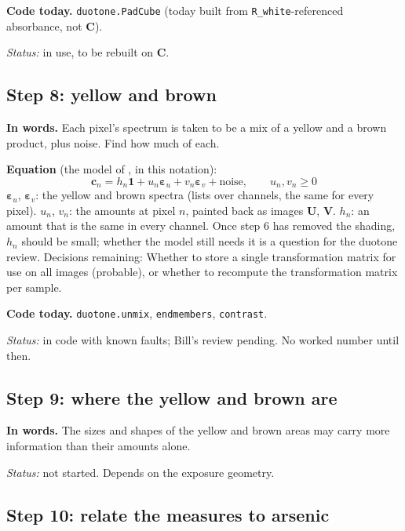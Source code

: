\documentclass[11pt,letter]{article}
\newcommand{\file}[1]{\texttt{\seqsplit{#1}}}
\newcommand{\code}[1]{\texttt{#1}}
\newcommand{\status}[1]{\par\noindent\textit{Status:} #1\par}
\newcommand{\mC}{\mathbf{C}}   %
\newcommand{\mU}{\mathbf{U}}   %
\newcommand{\mV}{\mathbf{V}}   %
\newcommand{\vc}{\mathbf{c}}           %
\newcommand{\vone}{\mathbf{1}}
\newcommand{\epsu}{\bm{\varepsilon}_u} %
\newcommand{\epsv}{\bm{\varepsilon}_v} %
\begin{document}
\textbf{Code today.}  \code{duotone.PadCube} (today built from
\code{R\_white}-referenced absorbance, not $\mC$).

\status{in use, to be rebuilt on $\mC$.}

\subsection{Step 8: yellow and brown}

\textbf{In words.}  Each pixel's spectrum is taken to be a mix of a yellow
and a brown product, plus noise.  Find how much of each.

\textbf{Equation} (the model of \file{duotone\_guide.tex}, in this
notation):
\begin{equation}
  \vc_n = h_n \vone + u_n \epsu + v_n \epsv + \text{noise},
  \qquad u_n, v_n \ge 0
\end{equation}
$\epsu$, $\epsv$: the yellow and brown spectra (lists over channels, the
same for every pixel).  $u_n$, $v_n$: the amounts at pixel $n$, painted back
as images $\mU$, $\mV$.  $h_n$: an amount that is the same in every channel.
Once step 6 has removed the shading, $h_n$ should be small; whether the
model still needs it is a question for the duotone review.
Decisions remaining:
Whether to store a single transformation matrix for use on all images (probable), or whether to recompute the transformation matrix per sample.

\textbf{Code today.}  \code{duotone.unmix}, \code{endmembers},
\code{contrast}.

\status{in code with known faults; Bill's review pending.  No worked
number until then.}

\subsection{Step 9: where the yellow and brown are}

\textbf{In words.}  The sizes and shapes of the yellow and brown areas may
carry more information than their amounts alone.

\status{not started.  Depends on the exposure geometry.}

\subsection{Step 10: relate the measures to arsenic}
\end{document}
